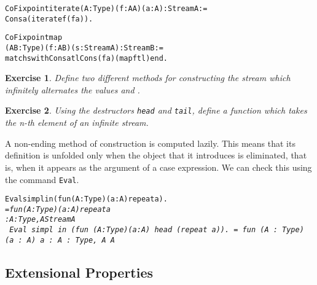 \documentclass[11pt]{article}
\newtheorem{exercise}{Exercise}[section]
\begin{document}
\begin{alltt}
CoFixpoint iterate (A: Type)(f: A {\arrow} A)(a : A) : Stream A:=
    Cons a (iterate f (f a)).

CoFixpoint map 
  (A B:Type)(f: A {\arrow} B)(s : Stream A) : Stream B:=
  match s with Cons a tl {\funarrow} Cons (f a) (map f tl) end.
\end{alltt}

\begin{exercise}
Define two different methods for constructing the stream which 
infinitely alternates the values  and .
\end{exercise}
\begin{exercise}
Using the destructors \texttt{head} and \texttt{tail}, define a function
which takes the n-th element of an infinite stream.
\end{exercise}

A non-ending method of construction is computed lazily. This means
that its definition is unfolded only when the object that it
introduces is eliminated, that is, when it appears as the argument of
a case expression. We can check this using the command
\texttt{Eval}.

\begin{alltt}
Eval simpl in (fun (A:Type)(a:A) {\funarrow} repeat a).
\it  = fun (A : Type) (a : A) {\funarrow} repeat a
     : {\prodsym} A : Type, A {\arrow} Stream A
\tt
Eval simpl in (fun (A:Type)(a:A) {\funarrow} head (repeat a)).
\it  = fun (A : Type) (a : A) {\funarrow} a
     : {\prodsym} A : Type, A {\arrow} A
\end{alltt}


\subsection{Extensional Properties}
\end{document}
